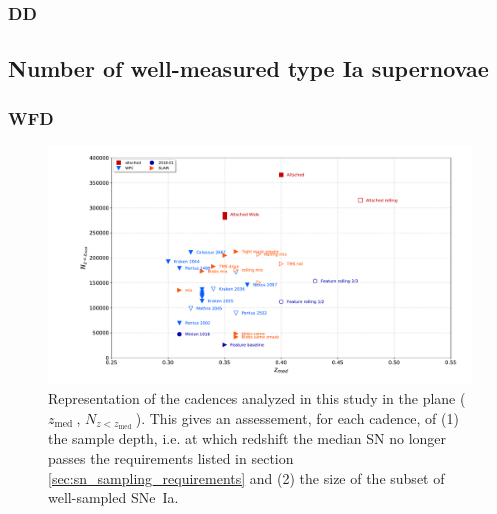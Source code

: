 \documentclass [11pt,a4paper]{article}
\newcommand{\zmed}{$z_{\mathrm{med}}\ $}
\newcommand{\nsnmed}{$N_{z<z_{\mathrm{med}}}\ $}
\begin{document}
\subsubsection{ DD}

\subsection{ Number of well-measured type Ia supernovae}

\subsubsection {WFD}

\begin{figure}
  \begin{center}
    \includegraphics[width=\linewidth]{Figures/summary_plot_wfd_mediansn.pdf}
    \caption{Representation of the cadences analyzed in this study in
      the plane (\zmed, \nsnmed). This gives an assessement, for each
      cadence, of (1) the sample depth, i.e. at which redshift the
      median SN no longer passes the requirements listed in section
      \ref{sec:sn_sampling_requirements} and (2) the size of the
      subset of well-sampled SNe~Ia.}
  \end{center}
\end{figure}
\end{document}
